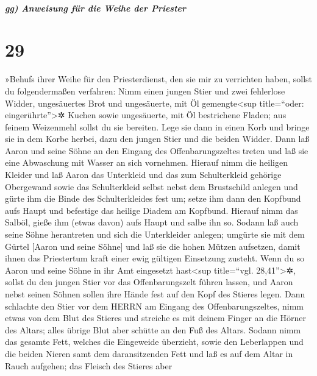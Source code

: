 \hypertarget{gg-anweisung-fuxfcr-die-weihe-der-priester}{%
\subparagraph{gg) Anweisung für die Weihe der
Priester}\label{gg-anweisung-fuxfcr-die-weihe-der-priester}}

\hypertarget{section-28}{%
\section{29}\label{section-28}}

 »Behufs ihrer Weihe für den Priesterdienst, den sie mir
zu verrichten haben, sollst du folgendermaßen verfahren: Nimm einen
jungen Stier und zwei fehlerlose Widder,  ungesäuertes
Brot und ungesäuerte, mit Öl gemengte\textless sup title=``oder:
eingerührte''\textgreater✲ Kuchen sowie ungesäuerte, mit Öl bestrichene
Fladen; aus feinem Weizenmehl sollst du sie bereiten. 
Lege sie dann in einen Korb und bringe sie in dem Korbe herbei, dazu den
jungen Stier und die beiden Widder.  Dann laß Aaron und
seine Söhne an den Eingang des Offenbarungszeltes treten und laß sie
eine Abwaschung mit Wasser an sich vornehmen.  Hierauf
nimm die heiligen Kleider und laß Aaron das Unterkleid und das zum
Schulterkleid gehörige Obergewand sowie das Schulterkleid selbst nebst
dem Brustschild anlegen und gürte ihm die Binde des Schulterkleides fest
um;  setze ihm dann den Kopfbund aufs Haupt und befestige
das heilige Diadem am Kopfbund.  Hierauf nimm das Salböl,
gieße ihm (etwas davon) aufs Haupt und salbe ihn so. 
Sodann laß auch seine Söhne herantreten und sich die Unterkleider
anlegen;  umgürte sie mit dem Gürtel {[}Aaron und seine
Söhne{]} und laß sie die hohen Mützen aufsetzen, damit ihnen das
Priestertum kraft einer ewig gültigen Einsetzung zusteht. Wenn du so
Aaron und seine Söhne in ihr Amt eingesetzt hast\textless sup
title=``vgl. 28,41''\textgreater✲,  sollst du den jungen
Stier vor das Offenbarungszelt führen lassen, und Aaron nebst seinen
Söhnen sollen ihre Hände fest auf den Kopf des Stieres legen.
 Dann schlachte den Stier vor dem HERRN am Eingang des
Offenbarungszeltes,  nimm etwas von dem Blut des Stieres
und streiche es mit deinem Finger an die Hörner des Altars; alles übrige
Blut aber schütte an den Fuß des Altars.  Sodann nimm das
gesamte Fett, welches die Eingeweide überzieht, sowie den Leberlappen
und die beiden Nieren samt dem daransitzenden Fett und laß es auf dem
Altar in Rauch aufgehen;  das Fleisch des Stieres aber
